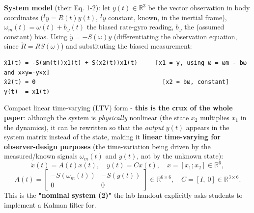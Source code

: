 \documentclass[11pt]{article}
\begin{document}
\textbf{System model} (their Eq. 1-2): let $y(t) \in \mathbb{R}^3$ be the vector observation in body coordinates (${}^Iy = R(t)y(t)$, ${}^Iy$ constant, known, in the inertial frame), $\omega_m(t) = \omega(t) + b_\omega(t)$ the biased rate-gyro reading, $b_\omega$ the (assumed constant) bias. Using $\dot y = -S(\omega)y$ (differentiating the observation equation, since $\dot R = RS(\omega)$) and substituting the biased measurement:
\begin{verbatim}
ẋ1(t) = -S(ωm(t))x1(t) + S(x2(t))x1(t)     [x1 = y, using ω = ωm - bω and x×y=-y×x]
ẋ2(t) = 0                                    [x2 = bω, constant]
y(t)  = x1(t)
\end{verbatim}
Compact linear time-varying (LTV) form - \textbf{this is the crux of the whole paper}: although the system is \textit{physically} nonlinear (the state $x_2$ multiplies $x_1$ in the dynamics), it can be rewritten so that the \textit{output} $y(t)$ appears in the system matrix instead of the state, making it \textbf{linear time-varying for observer-design purposes} (the time-variation being driven by the measured/known signals $\omega_m(t)$ and $y(t)$, not by the unknown state):
\[
\dot x(t) = A(t)x(t),\quad y(t) = Cx(t),\quad x = [x_1; x_2] \in \mathbb{R}^6,
\]
\[
A(t) = \begin{bmatrix}-S(\omega_m(t)) & -S(y(t)) \\ 0 & 0\end{bmatrix} \in \mathbb{R}^{6\times 6},\quad C = [I,\ 0] \in \mathbb{R}^{3\times 6}.
\]
This is the \textbf{"nominal system (2)"} the lab handout explicitly asks students to implement a Kalman filter for.
\end{document}
